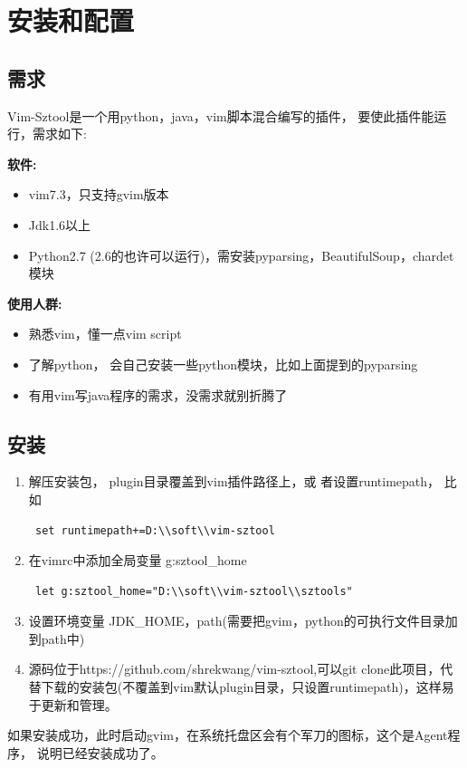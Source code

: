 \documentclass[oneside,openany]{book}
\begin{document}
\chapter{安装和配置}
  \section{需求}
  Vim-Sztool是一个用python，java，vim脚本混合编写的插件， 要使此插件能运行，需求如下:

  \textbf{软件:}
    \begin{itemize}
      \item vim7.3，只支持gvim版本
      \item Jdk1.6以上
      \item Python2.7 (2.6的也许可以运行)，需安装pyparsing，BeautifulSoup，chardet模块
    \end{itemize}

  \textbf{使用人群:}
    \begin{itemize}
      \item 熟悉vim，懂一点vim script
      \item 了解python， 会自己安装一些python模块，比如上面提到的pyparsing
      \item 有用vim写java程序的需求，没需求就别折腾了
    \end{itemize}

  \section{安装}
    \begin{enumerate}
      \item 解压安装包， plugin目录覆盖到vim插件路径上，或
      者设置runtimepath， 比如
      \begin{verbatim} set runtimepath+=D:\\soft\\vim-sztool \end{verbatim}
      \item 在vimrc中添加全局变量 g:sztool\_home
      \begin{verbatim} let g:sztool_home="D:\\soft\\vim-sztool\\sztools" \end{verbatim}
      \item 设置环境变量
      JDK\_HOME，path(需要把gvim，python的可执行文件目录加到path中)
      \item 源码位于https://github.com/shrekwang/vim-sztool,可以git clone此项目，代替下载的安装包(不覆盖到vim默认plugin目录，只设置runtimepath)，这样易于更新和管理。
    \end{enumerate}
   如果安装成功，此时启动gvim，在系统托盘区会有个军刀的图标，这个是Agent程序，
   说明已经安装成功了。
\end{document}
